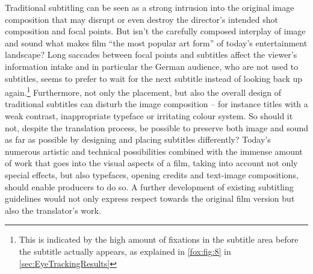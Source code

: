 \documentclass[output=paper]{langsci/langscibook}
\begin{document}
Traditional subtitling can be seen as a strong intrusion into the original image composition that may disrupt or even destroy the director's intended shot composition and focal points. But isn't the carefully composed interplay of image and sound what makes film ``the most popular art form'' \citep[35]{mercado2010} of today's entertainment landscape? Long saccades between focal points and subtitles affect the viewer's information intake and in particular the German audience, who are not used to subtitles, seems to prefer to wait for the next subtitle instead of looking back up again.\footnote{This is indicated by the high amount of fixations in the subtitle area before the subtitle actually appears, as explained in \autoref{fox:fig:8} in \autoref{sec:EyeTrackingResults}} Furthermore, not only the placement, but also the overall design of traditional subtitles can disturb the image composition – for instance titles with a weak contrast, inappropriate typeface or irritating colour system. So should it not, despite the translation process, be possible to preserve both image and sound as far as possible by designing and placing subtitles differently? Today's numerous artistic and technical possibilities combined with the immense amount of work that goes into the visual aspects of a film, taking into account not only special effects, but also typefaces, opening credits and text-image compositions, should enable producers to do so. A further development of existing subtitling guidelines would not only express respect towards the original film version but also the translator's work.
\end{document}

